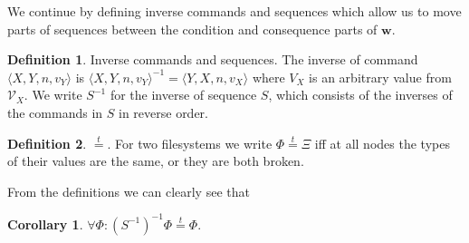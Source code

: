 \documentclass[12pt]{article}
\newcommand{\setvx}[1]{\mathcal{V}_{#1}} %
\newcommand{\FS}{\Phi} %
\newcommand{\GS}{\Xi} %
\newcommand{\valvx}{v_X} %
\newcommand{\valvy}{v_Y} %
\newcommand{\caaaa}[4]{\langle{#1,#2,#3,#4}\rangle}
\newcommand{\cxynv}{\caaaa{X}{Y}{n}{\valvy}}
\newcommand{\workssign}{\mathbf{w}}
\newcommand{\typeeq}{\stackrel{t}{=}} %
\theoremstyle{definition}
\newtheorem{mydef}{Definition}
\newtheorem{mycor}{Corollary}
\begin{document}
\medskip

We continue by defining inverse commands and sequences
which allow us to move parts of sequences between the
condition and consequence parts of $\workssign$.

\begin{mydef}{Inverse commands and sequences.}
The inverse of command $\cxynv$ is $\cxynv^{-1} = \caaaa{Y}{X}{n}{\valvx}$
where $V_X$ is an arbitrary value from $\setvx{X}$.
We write $S^{-1}$ for the inverse of sequence $S$, which consists of the inverses of the commands in $S$
in reverse order.
\end{mydef}

\begin{mydef}{$\typeeq$.}
For two filesystems we write $\FS\typeeq\GS$
iff 
at all nodes the types of their values are the same, or they are both broken.
\end{mydef}

From the definitions we can clearly see that
\begin{mycor}\label{negneg_is_typeeq}
$\forall \FS: (S^{-1})^{-1}\FS\typeeq \FS$.
\end{mycor}
\end{document}
